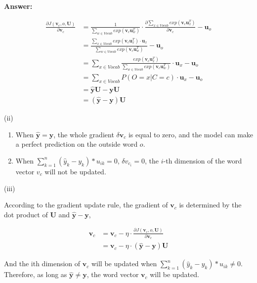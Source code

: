 \documentclass{article}
\newenvironment{answer}{
    {\bf Answer:} \sf \begingroup\color{red}
}{\endgroup}%
\begin{document}
\begin{enumerate}[label=(\alph*)]
\begin{shaded}
\begin{answer}
    \begin{equation}
        \begin{align}
            \frac{\partial{J(\bm v_c,o,\bm U)}}{\partial{\bm v_c}} &= \frac{1}{\sum_{w\in{Vocab}}exp(\bm v_c\bm u_w^T)}\cdot\frac{\partial{\sum_{x\in{Vocab}}exp(\bm v_c\bm u_x^T)}}{\partial{\bm v_c}} - \bm u_o \\
            &=\frac{\sum_{x\in{Vocab}}exp(\bm v_c\bm u_x^T) \cdot \bm u_x}{\sum_{w\in{Vocab}}exp(\bm v_c\bm u_w^T)} - \bm u_o \\
            &=\sum_{x\in{Vocab}} \frac{exp(\bm v_c\bm u_x^T)}{\sum_{w\in{Vocab}}exp(\bm v_c\bm u_w^T)} \cdot \bm u_x - \bm u_o \\
            &=\sum_{x\in{Vocab}} P(O=x|C=c) \cdot \bm u_x - \bm u_o \\
            &=\hat{\bm y}\bm U-\bm y\bm U \\
            &=(\hat{\bm y}- \bm y)\bm U
        \end{align}\label{eq:1b4}
    \end{equation}

    (ii)

    \begin{enumerate}
        \item When $\hat{\bm y} = \bm y$, the whole gradient $\delta \bm v_c$ is equal to zero, and the model can make a perfect prediction on the outside word $o$. \\
        \item When $\sum_{k=1}^{n} (\hat{y}_k- y_k)*u_{ik}=0$, $\delta v_{c_i}=0$, the $i$-th dimension of the word vector $v_c$ will not be updated.
    \end{enumerate}

    (iii)

    According to the gradient update rule, the gradient of $\bm v_c$ is determined by the dot product of $\mathbf{U}$ and $\hat{\mathbf{y}}- \mathbf{y}$,

    \begin{equation}
        \begin{align}
            \bm v_c &= \bm v_c - \eta \cdot \frac{\partial{J(\bm v_c,o,\bm U)}}{\partial{\bm v_c}} \\
            &= \bm v_c - \eta \cdot (\hat{\bm y}- \bm y)\bm U
        \end{align}\label{eq:1b5}
    \end{equation}

    And the ith dimension of $\bm v_c$ will be updated when $\sum_{k=1}^{n} (\hat{y}_k- y_k)*u_{ik}\neq0$.
    Therefore, as long as $\hat{\bm y}\neq \bm y$, the word vector $\bm v_c$ will be updated.


\end{answer}
\end{shaded}
\end{enumerate}
\end{document}
